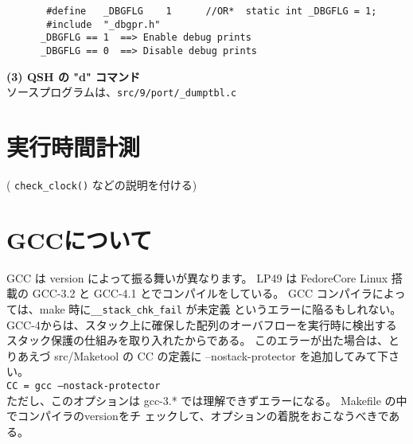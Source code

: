 \begin{verbatim}
       #define   _DBGFLG    1      //OR*  static int _DBGFLG = 1;
       #include  "_dbgpr.h"
      _DBGFLG == 1  ==> Enable debug prints
      _DBGFLG == 0  ==> Disable debug prints
\end{verbatim}

{\bf (3)  QSH の "d" コマンド}\\

        ソースプログラムは、\verb|src/9/port/_dumptbl.c|

\section{実行時間計測}
    
      ( \verb|check_clock()| などの説明を付ける)

    
\section{GCCについて}

      GCC は version によって振る舞いが異なります。
    LP49 は FedoreCore Linux 搭載の GCC-3.2 と GCC-4.1 とでコンパイルをしている。
      GCC コンパイラによっては、make 時に\verb|__stack_chk_fail| が未定義 
     というエラーに陥るもしれない。
     GCC-4からは、スタック上に確保した配列のオーバフローを実行時に検出する
    スタック保護の仕組みを取り入れたからである。
    このエラーが出た場合は、とりあえづ src/Maketool の CC の定義に
     --nostack-protector を追加してみて下さい。\\

   {\tt  CC = gcc --nostack-protector  }  \\
    

 ただし、このオプションは gcc-3.* では理解できずエラーになる。
  Makefile の中でコンパイラのversionをチ
    ェックして、オプションの着脱をおこなうべきである。

\begin{comment}
\end{comment}

